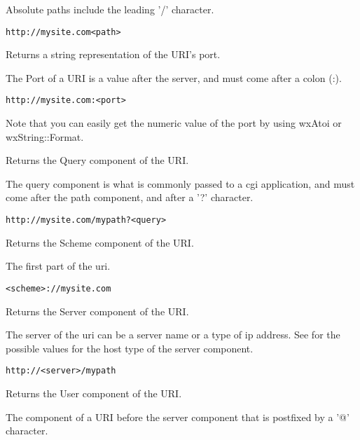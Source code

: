 Absolute paths include the leading '/'
character.

\tt{http://mysite.com<path>}

\label{wxurigetport}


Returns a string representation of the URI's port.

The Port of a URI is a value after the server, and 
must come after a colon (:).

\tt{http://mysite.com:<port>}

Note that you can easily get the numeric value of the port
by using wxAtoi or wxString::Format.

\label{wxurigetquery}


Returns the Query component of the URI.

The query component is what is commonly passed to a 
cgi application, and must come after the path component,
and after a '?' character.

\tt{http://mysite.com/mypath?<query>}


\label{wxurigetscheme}


Returns the Scheme component of the URI.

The first part of the uri.

\tt{<scheme>://mysite.com}


\label{wxurigetserver}


Returns the Server component of the URI.

The server of the uri can be a server name or 
a type of ip address.  See
 for the
possible values for the host type of the 
server component.

\tt{http://<server>/mypath}


\label{wxurigetuser}


Returns the User component of the URI.

The component of a URI before the server component
that is postfixed by a '@' character.

